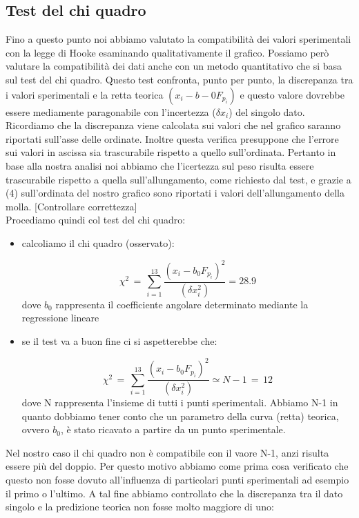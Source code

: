 \subsection{Test del chi quadro}
Fino a questo punto noi abbiamo valutato la compatibilità dei valori sperimentali con la legge di Hooke esaminando qualitativamente il grafico. Possiamo però valutare la compatibilità dei dati anche con un metodo quantitativo che si basa sul test del chi quadro. Questo test confronta, punto per punto, la discrepanza tra i valori sperimentali e la retta teorica
$(x_i - b-0 F_{p_i})$ e questo valore dovrebbe essere mediamente paragonabile con l'incertezza ($\delta x_i$) del singolo dato. Ricordiamo che la discrepanza viene calcolata sui valori che nel grafico saranno riportati sull'asse delle ordinate. Inoltre questa verifica presuppone che l'errore sui valori in ascissa sia trascurabile rispetto a quello sull'ordinata.
Pertanto in base alla nostra analisi noi abbiamo che l'icertezza sul peso risulta essere trascurabile rispetto  a quella sull'allungamento, come richiesto dal test, e grazie a (4) sull'ordinata del nostro grafico sono riportati i valori dell'allungamento della molla. [Controllare correttezza]\\
Procediamo quindi col test del chi quadro:
\begin{itemize}
\item{calcoliamo il chi quadro (osservato):

	\begin{equation*}
		\chi^2 \,=\, \sum_{i=1}^{13} \frac{(x_i - b_0 F_{p_i})^2}{(\delta x_i^2)} = 28.9
	\end{equation*}
	dove $b_0$ rappresenta il coefficiente angolare determinato mediante la regressione lineare}
\item{se il test va a buon fine ci si aspetterebbe che:

	\begin{equation*}
		\chi^2 \,=\, \sum_{i=1}^{13} \frac{(x_i - b_0 F_{p_i})^2}{(\delta x_i^2)} \simeq N - 1 \,=\, 12
	\end{equation*}
	dove N rappresenta l'insieme di tutti i punti sperimentali. Abbiamo N-1 in quanto dobbiamo tener conto che un parametro della curva (retta) teorica, ovvero $b_0$, è stato ricavato a partire da un punto sperimentale.}
\end{itemize}
Nel nostro caso il chi quadro non è compatibile con il vaore N-1, anzi risulta essere più del doppio.
Per questo motivo abbiamo come prima cosa verificato che questo non fosse dovuto all'influenza di particolari punti sperimentali ad esempio il primo o l'ultimo. A tal fine abbiamo controllato che la discrepanza tra il dato singolo e la predizione teorica non fosse molto maggiore di uno:

